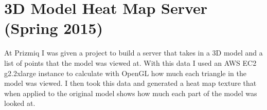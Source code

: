
\section{3D Model Heat Map Server (Spring 2015)}

At Prizmiq I was given a project to build a server that takes in
a 3D model and a list of points that the model was viewed at.
With this data I used an AWS EC2 g2.2xlarge instance to calculate with
OpenGL how much each triangle in the model was viewed.
I then took this data and generated a heat map texture that when applied to the
original model shows how much each part of the model was looked at.


